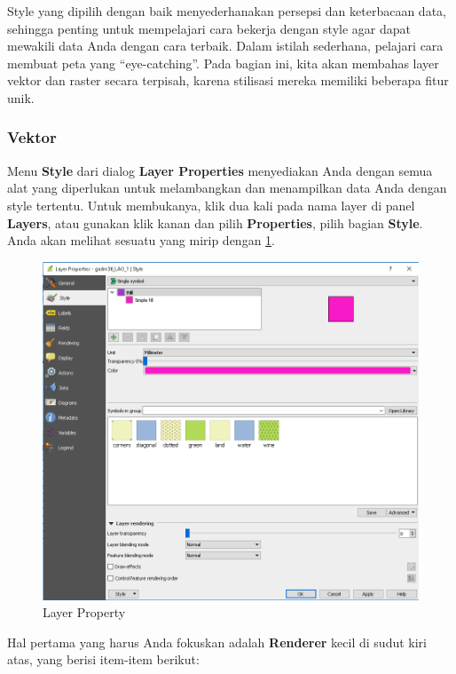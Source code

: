 \documentclass[]{book}
\begin{document}
Style yang dipilih dengan baik menyederhanakan persepsi dan keterbacaan data, sehingga penting untuk mempelajari cara bekerja dengan style agar dapat mewakili data Anda dengan cara terbaik. Dalam istilah sederhana, pelajari cara membuat peta yang ``eye-catching''. Pada bagian ini, kita akan membahas layer vektor dan raster secara terpisah, karena stilisasi mereka memiliki beberapa fitur unik.

\hypertarget{vektor}{%
\subsubsection{Vektor}\label{vektor}}

Menu \textbf{Style} dari dialog \textbf{Layer Properties} menyediakan Anda dengan semua alat yang diperlukan untuk melambangkan dan menampilkan data Anda dengan style tertentu. Untuk membukanya, klik dua kali pada nama layer di panel \textbf{Layers}, atau gunakan klik kanan dan pilih \textbf{Properties}, pilih bagian \textbf{Style}. Anda akan melihat sesuatu yang mirip dengan \ref{fig:fig92}.

\begin{figure}

{\centering \includegraphics[width=0.3\linewidth]{images/09/fig92} 

}

\caption{Layer Property}\label{fig:fig92}
\end{figure}

Hal pertama yang harus Anda fokuskan adalah \textbf{Renderer} kecil di sudut kiri atas, yang berisi item-item berikut:
\end{document}
